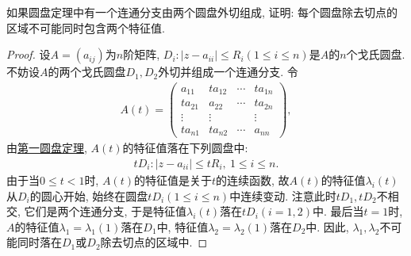 \documentclass[../../main.tex]{subfiles}
\begin{document}
\begin{example}
如果圆盘定理中有一个连通分支由两个圆盘外切组成, 证明: 每个圆盘除去切点的区域不可能同时包含两个特征值.
\end{example}
\begin{proof}
设\(A = (a_{ij})\)为\(n\)阶矩阵, \(D_{i}:|z - a_{ii}| \leq R_{i}(1 \leq i \leq n)\)是\(A\)的\(n\)个戈氏圆盘. 不妨设\(A\)的两个戈氏圆盘\(D_{1},D_{2}\)外切并组成一个连通分支. 令
\begin{align*}
A(t)= 
\begin{pmatrix}
a_{11} & ta_{12} & \cdots & ta_{1n}\\
ta_{21} & a_{22} & \cdots & ta_{2n}\\
\vdots & \vdots & & \vdots\\
ta_{n1} & ta_{n2} & \cdots & a_{nn}
\end{pmatrix},
\end{align*}
由\hyperref[theorem:第一圆盘定理]{第一圆盘定理}, \(A(t)\)的特征值落在下列圆盘中:
\begin{align*}
tD_{i}:|z - a_{ii}| \leq tR_{i},\ 1 \leq i \leq n.
\end{align*}
由于当\(0 \leq t < 1\)时, \(A(t)\)的特征值是关于\(t\)的连续函数, 故\(A(t)\)的特征值\(\lambda_{i}(t)\)从\(D_{i}\)的圆心开始, 始终在圆盘\(tD_{i}(1 \leq i \leq n)\)中连续变动. 注意此时\(tD_{1},tD_{2}\)不相交, 它们是两个连通分支, 于是特征值\(\lambda_{i}(t)\)落在\(tD_{i}(i = 1,2)\)中. 最后当\(t = 1\)时, \(A\)的特征值\(\lambda_{1}=\lambda_{1}(1)\)落在\(D_{1}\)中, 特征值\(\lambda_{2}=\lambda_{2}(1)\)落在\(D_{2}\)中. 因此, \(\lambda_{1},\lambda_{2}\)不可能同时落在\(D_{1}\)或\(D_{2}\)除去切点的区域中.
\end{proof}
\end{document}
